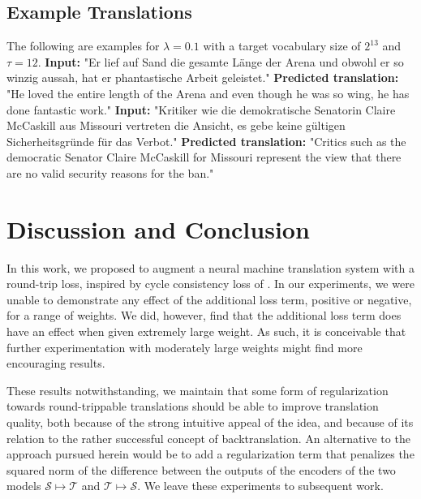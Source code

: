 \documentclass[11pt,a4paper]{article}
\begin{document}
\subsection{Example Translations}
The following are examples for $\lambda=0.1$ with a target vocabulary size of $2^{13}$ and $\tau=12$. \newline
\textbf{Input:} "Er lief auf Sand die gesamte Länge der Arena und obwohl er so winzig aussah, hat er phantastische Arbeit geleistet." \newline
\textbf{Predicted translation:} "He loved the entire length of the Arena and even though he was so wing, he has done fantastic work." \newline
\textbf{Input:} "Kritiker wie die demokratische Senatorin Claire McCaskill aus Missouri vertreten die Ansicht, es gebe keine gültigen Sicherheitsgründe für das Verbot." \newline
\textbf{Predicted translation:}  "Critics such as the democratic Senator Claire McCaskill for Missouri represent the view that there are no valid security reasons for the ban."

\section{Discussion and Conclusion}\label{sec:discussion}
In this work, we proposed to augment a neural machine translation system with a round-trip loss, inspired by cycle consistency loss of \citet{CycleGAN2017}. In our experiments, we were unable to demonstrate any effect of the additional loss term, positive or negative, for a range of weights. We did, however, find that the additional loss term does have an effect when given extremely large weight. As such, it is conceivable that further experimentation with moderately large weights might find more encouraging results. 

These results notwithstanding, we maintain that some form of regularization towards round-trippable translations should be able to improve translation quality, both because of the strong intuitive appeal of the idea, and because of its relation to the rather successful concept of backtranslation. An alternative to the approach pursued herein would be to add a regularization term that penalizes the squared norm of the difference between the outputs of the encoders of the two models $\mathcal{S}\mapsto\mathcal{T}$ and $\mathcal{T}\mapsto\mathcal{S}$. We leave these experiments to subsequent work.



\end{document}
